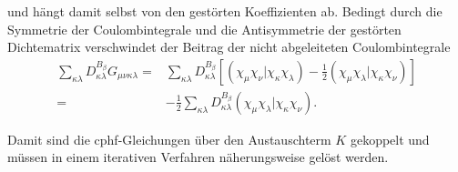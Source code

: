     und hängt damit selbst von den gestörten Koeffizienten ab. Bedingt durch die Symmetrie der Coulombintegrale und die Antisymmetrie der gestörten Dichtematrix verschwindet der Beitrag der nicht abgeleiteten Coulombintegrale    
    \begin{equation}\label{eq:dkaladbg}
    \begin{aligned}
    \sum_{\kappa\lambda}D_{\kappa\lambda}^{B_\beta}G_{\mu\nu\kappa\lambda}=& \sum_{\kappa\lambda}D_{\kappa\lambda}^{B_\beta}\left[\left(\chi_{\mu}\chi_{\nu}|\chi_{\kappa}\chi_{\lambda}\right)-\frac{1}{2}\left(\chi_{\mu}\chi_{\lambda}|\chi_{\kappa}\chi_{\nu}\right)\right] \\
    =&-\frac{1}{2}\sum_{\kappa\lambda}D_{\kappa\lambda}^{B_\beta}\left(\chi_{\mu}\chi_{\lambda}|\chi_{\kappa}\chi_{\nu}\right).
    \end{aligned}
    \end{equation}
    
    Damit sind die \ac{cphf}-Gleichungen über den Austauschterm $K$ gekoppelt und müssen in einem iterativen Verfahren näherungsweise gelöst werden.
    
